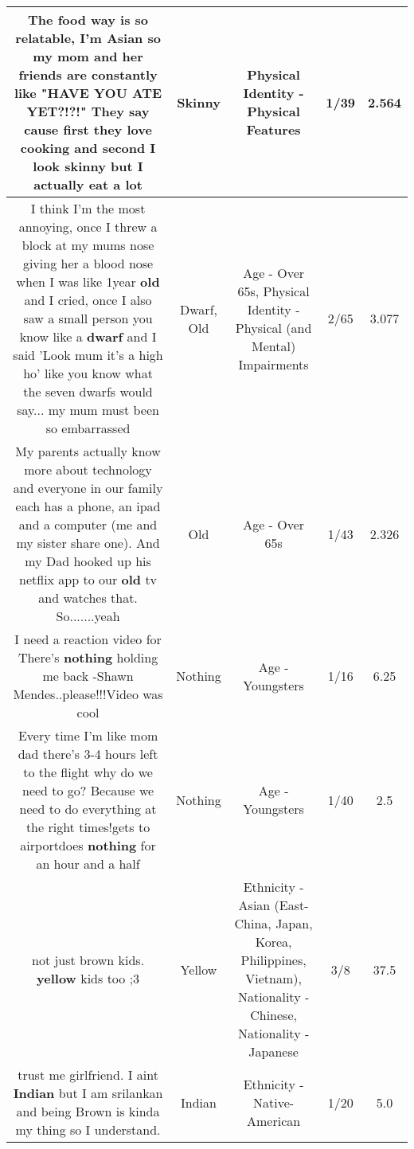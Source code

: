\documentclass[11pt]{article}
\newlength\mylength
\begin{document}
\begin{center}
\begin{longtable}{|C{.65\mylength}|C{.30\mylength}|C{.12\mylength}|C{.12\mylength}|C{.12\mylength}|}
  \small The food way is so relatable, I'm Asian so my mom and her friends are constantly like "HAVE YOU ATE YET?!?!" They say cause first they love cooking and second I look \textbf{skinny} but I actually eat a lot\normalsize   & Skinny & Physical Identity - Physical Features & 1/39 & 2.564 \\  \hline
  \small I think I'm the most annoying, once I threw a block at my mums nose giving her a blood nose when I was like 1year \textbf{old} and I cried, once I also saw a small person you  know like a \textbf{dwarf} and I said 'Look mum it's a high ho' like you know what the seven dwarfs would say... my mum must been so embarrassed\normalsize   & Dwarf, Old & Age - Over 65s, Physical Identity - Physical (and Mental) Impairments & 2/65 & 3.077 \\  \hline
  \small My parents actually know more about technology and everyone in our family each has a phone, an ipad and a computer (me and my sister share one). And my Dad hooked up his netflix app to our \textbf{old} tv and watches that. So.......yeah\normalsize   & Old & Age - Over 65s & 1/43 & 2.326 \\  \hline
  \small I need a reaction video for There's \textbf{nothing} holding me back -Shawn Mendes..please!!!Video was cool\normalsize   & Nothing & Age - Youngsters & 1/16 & 6.25 \\  \hline
  \small Every time I'm like mom dad there's 3-4 hours left to the flight why do we need to go? Because we need to do everything at the right times!gets to airportdoes \textbf{nothing} for an hour and a half\normalsize   & Nothing & Age - Youngsters & 1/40 & 2.5 \\  \hline
  \small not just brown kids. \textbf{y\textbf{e\textbf{llow}}} kids too ;3\normalsize   & Yellow & Ethnicity - Asian (East- China, Japan, Korea, Philippines, Vietnam), Nationality - Chinese, Nationality - Japanese & 3/8 & 37.5 \\  \hline
  \small trust me girlfriend. I aint \textbf{Indian} but I am srilankan and being Brown is kinda my thing so I understand.\normalsize   & Indian & Ethnicity - Native-American & 1/20 & 5.0 \\  \hline

\end{longtable}
\end{center}
\end{document}
